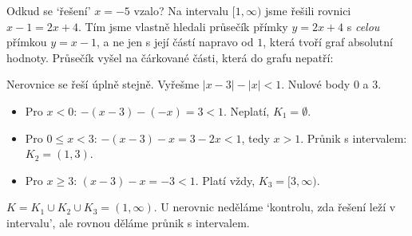 Odkud se `řešení' $x = -5$ vzalo? Na intervalu $[1, \infty)$ jsme řešili rovnici $x - 1 = 2x + 4$. Tím jsme vlastně hledali průsečík přímky $y = 2x + 4$ s \textit{celou} přímkou $y = x - 1$, a ne jen s její částí napravo od $1$, která tvoří graf absolutní hodnoty. Průsečík vyšel na čárkované části, která do grafu nepatří:
\begin{center}
\end{center}

\begin{example}
  Nerovnice se řeší úplně stejně. Vyřešme $|x - 3| - |x| < 1$. Nulové body $0$ a $3$.
  \begin{itemize}
    \item Pro $x < 0$: $-(x - 3) - (-x) = 3 < 1$. Neplatí, $K_1 = \emptyset$.
    \item Pro $0\leq x < 3$: $-(x - 3) - x = 3 - 2x < 1$, tedy $x > 1$. Průnik s intervalem: $K_2 = (1, 3)$.
    \item Pro $x\geq 3$: $(x - 3) - x = -3 < 1$. Platí vždy, $K_3 = [3, \infty)$.
  \end{itemize}
  $K = K_1\cup K_2\cup K_3 = (1, \infty)$. U nerovnic neděláme `kontrolu, zda řešení leží v intervalu', ale rovnou děláme průnik s intervalem.
\end{example}

